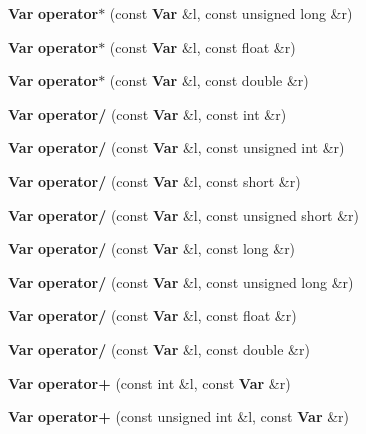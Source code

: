 \begin{CompactItemize}
\item 
{\bf Var} \textbf{operator$\ast$} (const {\bf Var} \&l, const unsigned long \&r)\label{classVar_f6ec1e49df9087313d16a1996a5b56b9}

\item 
{\bf Var} \textbf{operator$\ast$} (const {\bf Var} \&l, const float \&r)\label{classVar_76eddfbbcb6ce3b4e0c43c08ff8d62fe}

\item 
{\bf Var} \textbf{operator$\ast$} (const {\bf Var} \&l, const double \&r)\label{classVar_5c094b2208547b1b2bad13b6e976f7ed}

\item 
{\bf Var} \textbf{operator/} (const {\bf Var} \&l, const int \&r)\label{classVar_b11167b1c6a983a0b884d3819fce476a}

\item 
{\bf Var} \textbf{operator/} (const {\bf Var} \&l, const unsigned int \&r)\label{classVar_5071f85d07aa0f20dcb136d493cf2128}

\item 
{\bf Var} \textbf{operator/} (const {\bf Var} \&l, const short \&r)\label{classVar_00bfab22e5d267d23f08c3cd953d55d7}

\item 
{\bf Var} \textbf{operator/} (const {\bf Var} \&l, const unsigned short \&r)\label{classVar_3e47ad4fd49715cc8505d4094c9371bd}

\item 
{\bf Var} \textbf{operator/} (const {\bf Var} \&l, const long \&r)\label{classVar_9ac304983b488e99fa052b6a7bba392c}

\item 
{\bf Var} \textbf{operator/} (const {\bf Var} \&l, const unsigned long \&r)\label{classVar_281fe6770293875d26c2d2c1d72449da}

\item 
{\bf Var} \textbf{operator/} (const {\bf Var} \&l, const float \&r)\label{classVar_56f86bd37ce2de90187a5cba6c336b68}

\item 
{\bf Var} \textbf{operator/} (const {\bf Var} \&l, const double \&r)\label{classVar_5eb45d18589af6e48bc42231b773171c}

\item 
{\bf Var} \textbf{operator+} (const int \&l, const {\bf Var} \&r)\label{classVar_46e5fda32500be987e1289f9b76b278a}

\item 
{\bf Var} \textbf{operator+} (const unsigned int \&l, const {\bf Var} \&r)\label{classVar_fc411edd9a1a77eea7d62082ac2e3c1d}


\end{CompactItemize}
